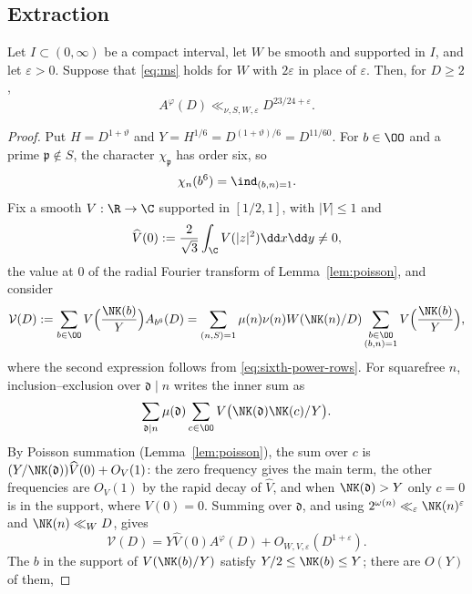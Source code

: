 \subsection{Extraction}
\begin{proposition}\label{prop:extraction}
Let $I\subset(0,\infty)$ be a compact interval, let $W$ be smooth and supported in $I$, and let
$\varepsilon>0$. Suppose that \eqref{eq:ms} holds for $W$ with $2\varepsilon$ in place of
$\varepsilon$. Then, for $D\ge2$,
\begin{equation}\label{eq:mobius-saving}
 A^\varphi(D)\ll_{\nu,S,W,\varepsilon}D^{23/24+\varepsilon}.
\end{equation}
\end{proposition}

\begin{proof}
Put $H=D^{1+\vartheta}$ and
$Y=H^{1/6}=D^{(1+\vartheta)/6}=D^{11/60}$. For $b\in\OO$ and a prime
$\mathfrak p\notin S$, the character $\chi_{\mathfrak p}$ has order six, so
\begin{equation}\label{eq:sixth-power-rows}
 \chi_n(b^6)=\ind_{(b,n)=1}.
\end{equation}
Fix a smooth $V:\R\to\C$ supported in $[1/2,1]$, with $|V|\le1$ and
\[
 \widehat V(0):=\frac2{\sqrt3}\int_{\C}V(|z|^2)\dd x\dd y\ne0,
\]
the value at $0$ of the radial Fourier transform of Lemma~\ref{lem:poisson}, and consider
\[
 \mathcal V(D):=\sum_{b\in\OO}V\Bigl(\frac{\NK(b)}Y\Bigr)A_{b^6}(D)
 =\sum_{(n,S)=1}\mu(n)\nu(n)W(\NK(n)/D)
 \sum_{\substack{b\in\OO\\(b,n)=1}}V\Bigl(\frac{\NK(b)}Y\Bigr),
\]
where the second expression follows from \eqref{eq:sixth-power-rows}.
For squarefree $n$, inclusion--exclusion over $\mathfrak d\mid n$ writes the
inner sum as
\[
 \sum_{\mathfrak d\mid n}\mu(\mathfrak d)\sum_{c\in\OO}V\bigl(\NK(\mathfrak d)\NK(c)/Y\bigr).
\]
By Poisson summation (Lemma~\ref{lem:poisson}), the sum over $c$ is
$(Y/\NK(\mathfrak d))\widehat V(0)+O_V(1)$: the zero frequency gives the main term, the other
frequencies are $O_V(1)$ by the rapid decay of $\widehat V$, and when $\NK(\mathfrak d)>Y$ only
$c=0$ is in the support, where $V(0)=0$. Summing over $\mathfrak d$, and using
$2^{\omega(n)}\ll_\varepsilon\NK(n)^\varepsilon$ and $\NK(n)\ll_W D$, gives
\begin{equation}\label{eq:extraction-evaluation}
 \mathcal V(D)=Y\widehat V(0)A^\varphi(D)+O_{W,V,\varepsilon}(D^{1+\varepsilon}).
\end{equation}
The $b$ in the support of $V(\NK(b)/Y)$ satisfy $Y/2\le\NK(b)\le Y$; there are $O(Y)$ of them,

\end{proof}
